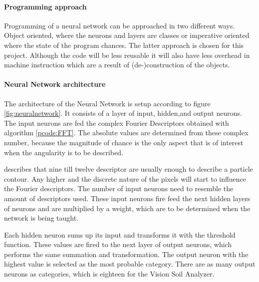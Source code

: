 \documentclass[11pt,fleqn,,a4paper,twoside,openright]{book}
\begin{document}
\paragraph{Programming approach}
Programming of a neural network can be approached in two different ways. Object oriented, where the neurons and layers are classes or imperative oriented where the state of the program chances. The latter approach is chosen for this project. Although the code will be less reusable it will also have less overhead in machine instruction which are a result of (de-)construction of the objects.

\paragraph{Neural Network architecture}\label{NNArchitecture}
The architecture of the Neural Network is setup according to figure \ref{fig:neuralnetwork}. It consists of a layer of input, hidden,and output neurons. The input neurons are fed the complex Fourier Descriptors obtained with algorithm \ref{pcode:FFT}. The absolute values are determined from these complex number, because the magnitude of chance is the only aspect that is of interest when the angularity is to be described.

\citeauthor{Spijker14a} \cite{Spijker14a} describes that nine till twelve  descriptor are usually enough to describe a particle contour. Any higher and the discrete nature of the pixels will start to influence the Fourier descriptors. The number of input neurons need to resemble the amount of descriptors used. These input neurons fire feed the next hidden layers of neurons and are multiplied by a weight, which are to be determined when the network is being taught.

Each hidden neuron sums up its input and transforms it with the threshold function. These values are fired to the next layer of output neurons, which performs the same summation and transformation. The output neuron with the highest value is selected as the most probable category. There are as many output neurons as categories, which is eighteen for the Vision Soil Analyzer.
\end{document}
